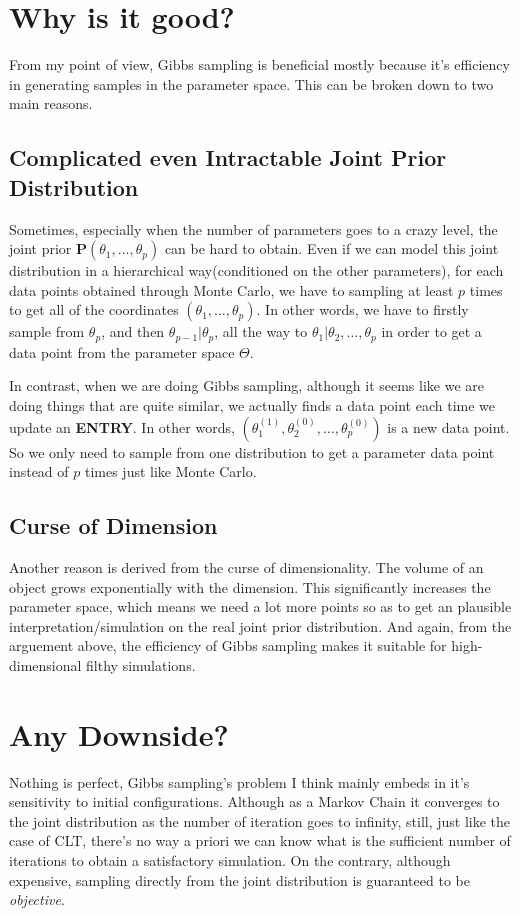 \section*{Why is it good?}
From my point of view, Gibbs sampling is beneficial mostly because it's efficiency in generating samples in the parameter space. This can be broken down to two main reasons.

\subsection*{Complicated even Intractable Joint Prior Distribution}
Sometimes, especially when the number of parameters goes to a crazy level, the joint prior $\mathbf{P}(\theta_1, \ldots, \theta_p)$ can be hard to obtain. Even if we can model this joint distribution in a hierarchical way(conditioned on the other parameters), for each data points obtained through Monte Carlo, we have to sampling at least $p$ times to get all of the coordinates $(\theta_1, \ldots, \theta_p)$. In other words, we have to firstly sample from $\theta_p$, and then $\theta_{p-1} | \theta_p$, all the way to $\theta_1 | \theta_2, \ldots, \theta_p$ in order to get a data point from the parameter space $\Theta$. 

In contrast, when we are doing Gibbs sampling, although it seems like we are doing things that are quite similar, we actually finds a data point each time we update an \textbf{ENTRY}. In other words, $(\theta_1^{(1)}, \theta_2^{(0)}, \ldots, \theta_p^{(0)})$ is a new data point. So we only need to sample from one distribution to get a parameter data point instead of $p$ times just like Monte Carlo. 

\subsection*{Curse of Dimension}
Another reason is derived from the curse of dimensionality. The volume of an object grows exponentially with the dimension. This significantly increases the parameter space, which means we need a lot more points so as to get an plausible interpretation/simulation on the real joint prior distribution. And again, from the arguement above, the efficiency of Gibbs sampling makes it suitable for high-dimensional filthy simulations. 

\section*{Any Downside?}
Nothing is perfect, Gibbs sampling's problem I think mainly embeds in it's sensitivity to initial configurations. Although as a Markov Chain it converges to the joint distribution as the number of iteration goes to infinity, still, just like the case of CLT, there's no way a priori we can know what is the sufficient number of iterations to obtain a satisfactory simulation. On the contrary, although expensive, sampling directly from the joint distribution is guaranteed to be \emph{objective}.